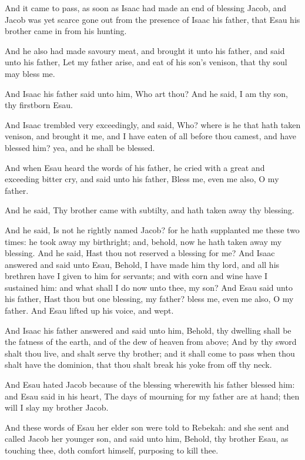 \verse And it came to pass, as soon as Isaac had made an end of blessing Jacob, and Jacob was yet scarce gone out from the presence of Isaac his father, that Esau his brother came in from his hunting.

\verse And he also had made savoury meat, and brought it unto his father, and said unto his father, Let my father arise, and eat of his son's venison, that thy soul may bless me.

\verse And Isaac his father said unto him, Who art thou? And he said, I am thy son, thy firstborn Esau.

\verse And Isaac trembled very exceedingly, and said, Who? where is he that hath taken venison, and brought it me, and I have eaten of all before thou camest, and have blessed him? yea, and he shall be blessed.

\verse And when Esau heard the words of his father, he cried with a great and exceeding bitter cry, and said unto his father, Bless me, even me also, O my father.

\verse And he said, Thy brother came with subtilty, and hath taken away thy blessing.

\verse And he said, Is not he rightly named Jacob? for he hath supplanted me these two times: he took away my birthright; and, behold, now he hath taken away my blessing. And he said, Hast thou not reserved a blessing for me?  \verse And Isaac answered and said unto Esau, Behold, I have made him thy lord, and all his brethren have I given to him for servants; and with corn and wine have I sustained him: and what shall I do now unto thee, my son?  \verse And Esau said unto his father, Hast thou but one blessing, my father? bless me, even me also, O my father. And Esau lifted up his voice, and wept.

\verse And Isaac his father answered and said unto him, Behold, thy dwelling shall be the fatness of the earth, and of the dew of heaven from above; \verse And by thy sword shalt thou live, and shalt serve thy brother; and it shall come to pass when thou shalt have the dominion, that thou shalt break his yoke from off thy neck.

\verse And Esau hated Jacob because of the blessing wherewith his father blessed him: and Esau said in his heart, The days of mourning for my father are at hand; then will I slay my brother Jacob.

\verse And these words of Esau her elder son were told to Rebekah: and she sent and called Jacob her younger son, and said unto him, Behold, thy brother Esau, as touching thee, doth comfort himself, purposing to kill thee.

